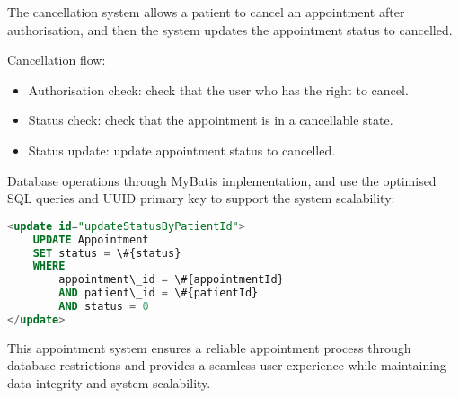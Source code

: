 The cancellation system allows a patient to cancel an appointment after authorisation, and then the system updates the appointment status to cancelled.

Cancellation flow:
\begin{itemize}
    \item Authorisation check: check that the user who has the right to cancel.
    \item Status check: check that the appointment is in a cancellable state.
    \item Status update: update appointment status to cancelled.
\end{itemize}

Database operations through MyBatis implementation, and use the optimised SQL queries and UUID primary key to support the system scalability:

\begin{lstlisting}[language=SQL, caption=Appointment Status Update Query]
<update id="updateStatusByPatientId">
    UPDATE Appointment
    SET status = \#{status}
    WHERE
        appointment\_id = \#{appointmentId}
        AND patient\_id = \#{patientId}
        AND status = 0
</update>
\end{lstlisting}

This appointment system ensures a reliable appointment process through database restrictions and provides a seamless user experience while maintaining data integrity and system scalability.

